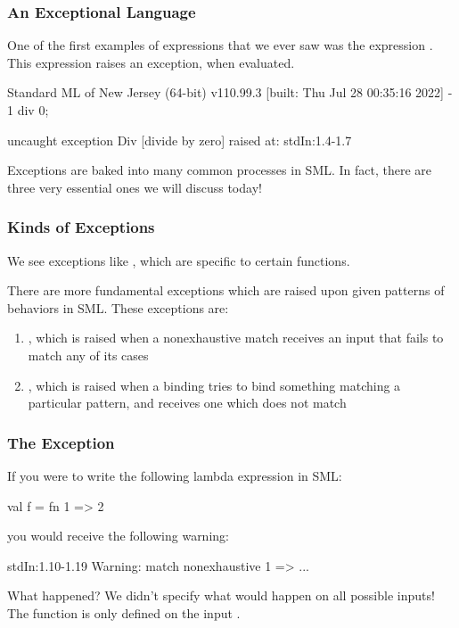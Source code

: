 \documentclass[aspectratio=169, handout]{beamer}
\begin{document}
\begin{frame}[fragile]
  \frametitle{An Exceptional Language}

  One of the first examples of expressions that we ever saw was the
  expression . This expression raises an exception,
  when evaluated.

  \pause
  \vspace{\fill}

  \begin{codeblock}
    Standard ML of New Jersey (64-bit) v110.99.3 [built: Thu Jul 28 00:35:16 2022]
    - 1 div 0;

    uncaught exception Div [divide by zero]
      raised at: stdIn:1.4-1.7
  \end{codeblock}

  \pause
  \vspace{\fill}

  Exceptions are baked into many common processes in SML. In fact, there are
  three very essential ones we will discuss today!
\end{frame}

\begin{frame}[fragile]
  \frametitle{Kinds of Exceptions}

  We see exceptions like , which are specific to certain functions.

  \pause
  \vspace{\fill}

  There are more fundamental exceptions which are raised upon given patterns
  of behaviors in SML. These exceptions are:
  \pause
  \begin{enumerate}
    \item {}, which is raised when a nonexhaustive match receives
    an input that fails to match any of its cases \pause
    \item {}, which is raised when a  binding tries to
    bind something matching a particular pattern, and receives one which
    does not match
  \end{enumerate}
\end{frame}

\begin{frame}[fragile]
  \frametitle{The  Exception}

  If you were to write the following lambda expression in SML:
  \begin{codeblock}
    val f = fn 1 => 2
  \end{codeblock}

  you would receive the following warning:
  \pause
  \begin{codeblock}
    stdIn:1.10-1.19 Warning: match nonexhaustive
              1 => ...
  \end{codeblock}

  \pause
  \vspace{\fill}

  What happened? We didn't specify what would happen on all possible inputs!
  The function is only defined on the input .
\end{frame}
\end{document}
